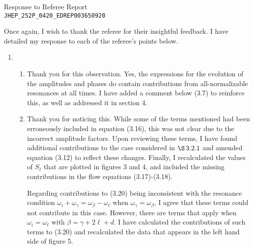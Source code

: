 \documentclass[11pt,letterpaper]{article}
\begin{document}
\vspace{.2in}
\begin{center}
    {\Large Response to Referee Report \\ \verb+JHEP_252P_0420_EDREP003650920+}  
\end{center}

\vspace{.25in}

Once again, I wish to thank the referee for their insightful feedback. I have detailed my response to each of the referee's points below.

\begin{enumerate}
    \item %
    \begin{enumerate}
        \item Thank you for this observation. Yes, the expressions for the evolution of the amplitudes and phases do contain contributions from all-normalizable resonances at all times. I have added a comment below (3.7) to reinforce this, as well as addressed it in section 4.
        \item Thank you for noticing this. While some of the terms mentioned had been erroneously included in equation (3.16), this was not clear due to the incorrect amplitude factors. Upon reviewing these terms, I have found additional contributions to the case considered in $\S\!~3.2.1$ and amended equation (3.12) to reflect these changes. Finally, I recalculated the values of $S_\ell$ that are plotted in figures 3 and 4, and included the missing contributions in the flow equations (3.17)-(3.18).
        
        Regarding contributions to (3.20) being inconsistent with the resonance condition $\omega_i + \omega_\gamma = \omega_\beta - \omega_\ell$ when $\omega_\gamma = \omega_\beta$, I agree that these terms could not contribute in this case. However, there are terms that apply when $\omega_i = \omega_\ell$ with $\beta = \gamma + 2\ell + d$. I have calculated the contributions of such terms to (3.20) and recalculated the data that appears in the left hand side of figure 5.
        

\end{enumerate}
\end{enumerate}
\end{document}
